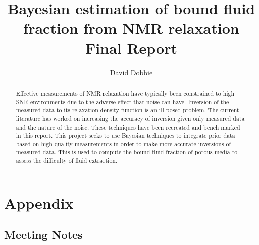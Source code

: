 \documentclass[11pt
              , a4paper
              , twoside
              , openright
              ]{report}
\title{Bayesian estimation of bound fluid fraction from NMR relaxation \\ Final Report}
\author{David Dobbie}
\date{}
\begin{document}
\frontmatter



\begin{abstract}

Effective measurements of NMR relaxation have typically been constrained to high SNR environments due to the adverse effect that noise can have. Inversion of the measured data to its relaxation density function is an ill-posed problem. The current literature has worked on increasing the accuracy of inversion given only measured data and the nature of the noise. These techniques have been recreated and bench marked in this report. This project seeks to use Bayesian techniques to integrate prior data based on high quality measurements in order to make more accurate inversions of  measured data. This is used to compute the bound fluid fraction of porous  media to assess the difficulty of fluid extraction.
\end{abstract}


\maketitle

\tableofcontents



\mainmatter
















\backmatter




%


\chapter{Appendix}
\section{Meeting Notes}

\end{document}
